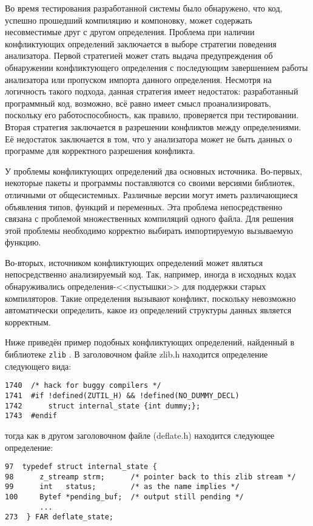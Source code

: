 Во время тестирования разработанной системы было обнаружено, что код, успешно прошедший компиляцию и компоновку, может содержать несовместимые друг с другом определения. Проблема при наличии конфликтующих определений заключается в выборе стратегии поведения анализатора. Первой стратегией может стать выдача предупреждения об обнаружении конфликтующего определения с последующим завершением работы анализатора или пропуском импорта данного определения. Несмотря на логичность такого подхода, данная стратегия имеет недостаток: разработанный программный код, возможно, всё равно имеет смысл проанализировать, поскольку его работоспособность, как правило, проверяется при тестировании. Вторая стратегия заключается в разрешении конфликтов между определениями. Её недостаток заключается в том, что у анализатора может не быть данных о программе для корректного разрешения конфликта.

У проблемы конфликтующих определений два основных источника. Во-первых, некоторые пакеты и программы поставляются со своими версиями библиотек, отличными от общесистемных. Различные версии могут иметь различающиеся объявления типов, функций и переменных. Эта проблема непосредственно связана с проблемой множественных компиляций одного файла. Для решения этой проблемы необходимо корректно выбирать импортируемую вызываемую функцию.

Во-вторых, источником конфликтующих определений может являться непосредственно анализируемый код. Так, например, иногда в исходных кодах обнаруживались определения-<<пустышки>> для поддержки старых компиляторов. Такие определения вызывают конфликт, поскольку невозможно автоматически определить, какое из определений структуры данных является корректным.

Ниже приведён пример подобных конфликтующих определений, найденный в библиотеке \texttt{zlib} \cite{zlib}. В заголовочном файле zlib.h находится определение следующего вида:

\begin{verbatim}
1740  /* hack for buggy compilers */
1741  #if !defined(ZUTIL_H) && !defined(NO_DUMMY_DECL)
1742      struct internal_state {int dummy;};
1743  #endif
\end{verbatim}

тогда как в другом заголовочном файле (deflate.h) находится следующее определение:

\begin{verbatim}
97  typedef struct internal_state {
98      z_streamp strm;      /* pointer back to this zlib stream */
99      int   status;        /* as the name implies */
100     Bytef *pending_buf;  /* output still pending */
        ...
273  } FAR deflate_state;
\end{verbatim}

